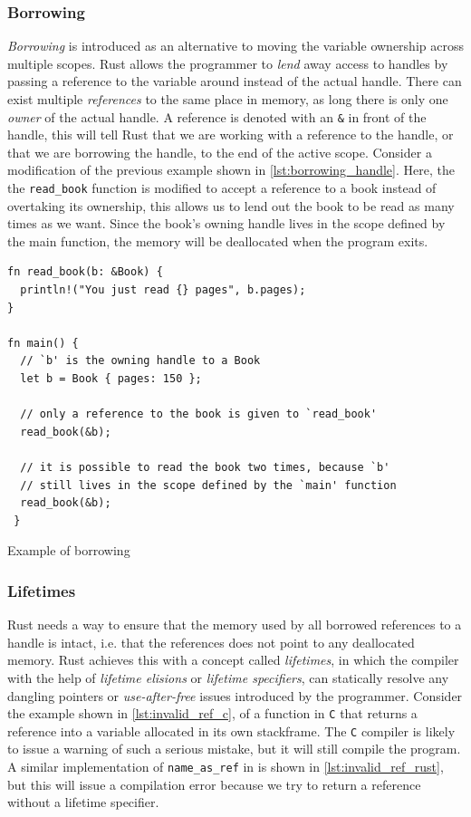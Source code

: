 \subsubsection{Borrowing}

\emph{Borrowing} is introduced as an alternative to moving the variable ownership across multiple scopes.
Rust allows the programmer to \emph{lend} away access to handles by passing a reference to the variable around instead of the actual handle.
There can exist multiple \emph{references} to the same place in memory, as long there is only one \emph{owner} of the actual handle.
A reference is denoted with an \texttt{\&} in front of the handle, this will tell Rust that we are working with a reference to the handle, or that we are borrowing the handle, to the end of the active scope.
Consider a modification of the previous example shown in \autoref{lst:borrowing_handle}.
Here, the the \texttt{read\_book} function is modified to accept a reference to a book instead of overtaking its ownership, this allows us to lend out the book to be read as many times as we want.
Since the book's owning handle lives in the scope defined by the main function, the memory will be deallocated when the program exits.

\begin{listing}[tb]
\begin{verbatim}
fn read_book(b: &Book) {
  println!("You just read {} pages", b.pages);
}

fn main() {
  // `b' is the owning handle to a Book
  let b = Book { pages: 150 };

  // only a reference to the book is given to `read_book'
  read_book(&b);

  // it is possible to read the book two times, because `b'
  // still lives in the scope defined by the `main' function
  read_book(&b);
 }
\end{verbatim}
\caption{Example of borrowing}
\label{lst:borrowing_handle}
\end{listing}

\subsubsection{Lifetimes}

Rust needs a way to ensure that the memory used by all borrowed references to a handle is intact, i.e. that the references does not point to any deallocated memory.
Rust achieves this with a concept called \emph{lifetimes}, in which the compiler with the help of \emph{lifetime elisions} or \emph{lifetime specifiers}, can statically resolve any dangling pointers or \emph{use-after-free} issues introduced by the programmer.
Consider the example shown in \autoref{lst:invalid_ref_c}, of a function in \texttt{C} that returns a reference into a variable allocated in its own stackframe.
The \texttt{C} compiler is likely to issue a warning of such a serious mistake, but it will still compile the program.
A similar implementation of \texttt{name\_as\_ref} in \rust is shown in \autoref{lst:invalid_ref_rust}, but this will issue a compilation error because we try to return a reference without a lifetime specifier.

